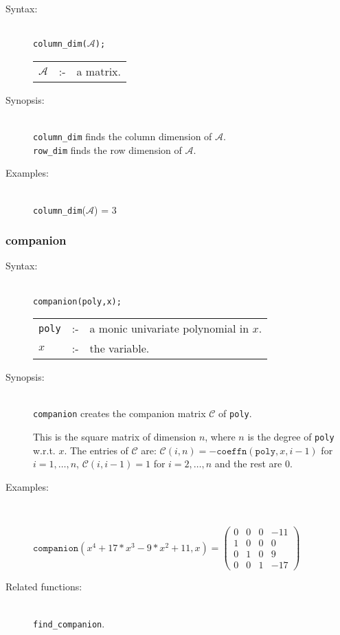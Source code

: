 \begin{description}
\item[Syntax:]\mbox{}\\
\texttt{column\_dim($\mathcal{A}$);}\\[2mm]
\begin{tabular}{l l l}
$\mathcal{A}$ &:-& a matrix.
\end{tabular}

\item[Synopsis:]\mbox{}\\
\texttt{column\_dim} finds the column dimension of 
                $\mathcal{A}$. \\
\texttt{row\_dim} finds the row dimension of $\mathcal{A}$.

\item[Examples:]\mbox{}\\
\texttt{column\_dim}($\mathcal{A}$) = 3
\end{description}

\subsubsection{companion}
\label{linalg:companion}

\begin{description}
\item[Syntax:]\mbox{}\\
\texttt{companion(poly,x);}\\[2mm]
\begin{tabular}{l l l}
\texttt{poly} &:-& a monic univariate polynomial in $x$. \\
$x$    &:-& the variable.
\end{tabular}

\item[Synopsis:]\mbox{}\\
                \texttt{companion} creates the companion matrix $\mathcal{C}$
                of \texttt{poly}. 

This is the square matrix of dimension $n$, where $n$ is the degree
of \texttt{poly} w.r.t. $x$. The entries of $\mathcal{C}$ are: $\mathcal{C}(i,n)
= -\texttt{coeffn}(\texttt{poly},x,i-1)$ for $i = 1,\ldots, n$,
$\mathcal{C}(i,i-1) = 1$ for $i=2,\ldots,n$ and the rest are $0$.

\item[Examples:]\mbox{}\\
\begin{flushleft}  
\begin{math}  
\texttt{companion}(x^4+17*x^3-9*x^2+11,x) = 
 \begin{pmatrix} 0 & 0 & 0 & -11 \\ 1 & 0 & 0 & 0 \\ 
0 & 1 & 0 & 9 \\ 0 & 0 & 1 & -17 \end{pmatrix}
\end{math}  
\end{flushleft}

\item[Related functions:]\mbox{}\\
\texttt{find\_companion}.
\end{description}


